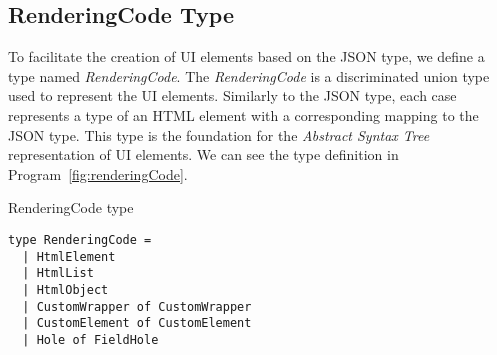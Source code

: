 \subsection{RenderingCode Type}
To facilitate the creation of UI elements based on the JSON type, we define a type named \emph{RenderingCode}.
The \emph{RenderingCode} is a discriminated union type used to represent the UI elements.
Similarly to the JSON type, each case represents a type of an HTML element with a corresponding mapping to the JSON type.
This type is the foundation for the \emph{Abstract Syntax Tree} representation of UI elements.
We can see the type definition in Program~\ref{fig:renderingCode}.
\begin{listing}[htbp]
	\caption {RenderingCode type}
	\label{fig:renderingCode}
	\begin{lstlisting}
type RenderingCode =
  | HtmlElement 
  | HtmlList 
  | HtmlObject 
  | CustomWrapper of CustomWrapper
  | CustomElement of CustomElement
  | Hole of FieldHole
  \end{lstlisting}
\end{listing}

